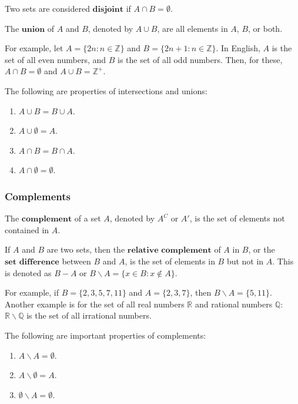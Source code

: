 \documentclass[openany]{book}
\begin{document}
Two sets are considered $\textbf{disjoint}$ if $A \cap B = \emptyset$.

\begin{defn}[Union]
	The $\textbf{union}$ of $A$ and $B$, denoted by $A\cup B$, are all elements in $A$, $B$, or both. 
\end{defn}

\begin{example}
	For example, let $A=\{2n:n\in\mathbb{Z}\}$ and $B=\{2n+1:n\in\mathbb{Z}\}$. In English, $A$ is the set of all even numbers, and $B$ is the set of all odd numbers. Then, for these, $A\cap B=\emptyset$ and $A\cup B=\mathbb{Z}^+$.
\end{example}

The following are properties of intersections and unions:
\begin{enumerate}
	\item $A\cup B=B\cup A$.
	\item $A\cup\emptyset = A$.
	\item $A\cap B = B\cap A$.
	\item $A\cap\emptyset=\emptyset$.
\end{enumerate}

\subsubsection{Complements}
\begin{defn}[Complement]
	The $\textbf{complement}$ of a set $A$, denoted by $A^C$ or $A'$, is the set of elements not contained in $A$.
\end{defn}

\begin{defn}
	If $A$ and $B$ are two sets, then the $\textbf{relative complement}$ of $A$ in $B$, or the $\textbf{set difference}$ between $B$ and $A$, is the set of elements in $B$ but not in $A$. This is denoted as $B-A$ or $B\backslash A=\{x\in B:x \not\in A\}$.
\end{defn}

\begin{example}
	For example, if $B=\{2,3,5,7,11\}$ and $A=\{2,3,7\}$, then $B\backslash A=\{5,11\}$. Another example is for the set of all real numbers $\mathbb{R}$ and rational numbers $\mathbb{Q}$: $\mathbb{R}\backslash\mathbb{Q}$ is the set of all irrational numbers.
\end{example}

The following are important properties of complements:
\begin{enumerate}
	\item $A\backslash A = \emptyset$.
	\item $A\backslash\emptyset = A$.
	\item $\emptyset\backslash A=\emptyset$.
\end{enumerate}
\end{document}
